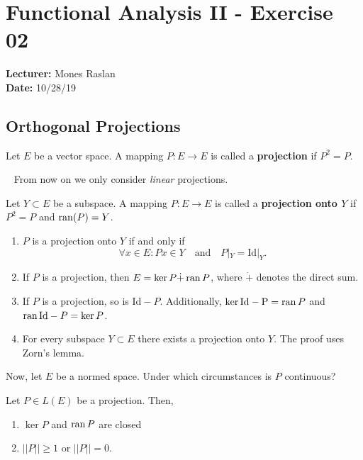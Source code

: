 \documentclass[9pt]{extarticle}
\begin{document}
\section*{Functional Analysis II - Exercise 02}
\textbf{Lecturer:} Mones Raslan \\
\noindent\textbf{Date:} 10/28/19

\subsection*{Orthogonal Projections}
\begin{definition}{}{}
Let $E$ be a vector space. A mapping $P: E \to E$ is called a \textbf{projection} if $P^2 = P$.
\end{definition} 
From now on we only consider \textit{linear} projections.

\begin{definition}{}{}
Let $Y \subset E$ be a subspace. A mapping $P: E \to E$ is called a \textbf{projection onto $Y$} if $P^2 = P$ and $\operatorname{ran}(P) = Y$.
\end{definition}

\begin{proposition}{}{}
\begin{enumerate}
\item $P$ is a projection onto $Y$ if and only if
\[
    \forall x \in E: Px \in Y \quad \text{and} \quad P|_Y = \mathrm{Id}|_Y.
\]

\item If $P$ is a projection, then $E = \ker P \dot + \operatorname{ran} P$, where $\dot +$ denotes the direct sum.

\item If $P$ is a projection, so is $\mathrm{Id} - P$. Additionally, $\ker{\mathrm{Id - P}} = \operatorname{ran} P$ and $\operatorname{ran} \mathrm{Id} - P = \ker P$.

\item For every subspace $Y \subset E$ there exists a projection onto $Y$. The proof uses Zorn's lemma.
\end{enumerate}
\end{proposition}
Now, let $E$ be a normed space. Under which circumstances is $P$ continuous?

\begin{proposition}{}{}
Let $P \in L(E)$ be a projection. Then,
\begin{enumerate}
\item $\ker P$ and $\operatorname{ran} P$ are closed
\item $||P|| \geq 1$ or $||P|| = 0$.
\end{enumerate}
\end{proposition}
\end{document}
